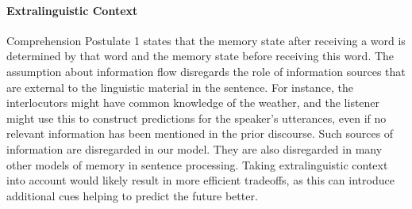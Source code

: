 \paragraph{Extralinguistic Context}
Comprehension Postulate 1 states that the memory state after receiving a word is determined by that word and the memory state before receiving this word.
The assumption about information flow disregards the role of information sources that are external to the linguistic material in the sentence.
For instance, the interlocutors might have common knowledge of the weather, and the listener might use this to construct predictions for the speaker's utterances, even if no relevant information has been mentioned in the prior discourse.
Such sources of information are disregarded in our model.
They are also disregarded in many other models of memory in sentence processing.
Taking extralinguistic context into account would likely result in more efficient tradeoffs, as this can introduce additional cues helping to predict the future better.


